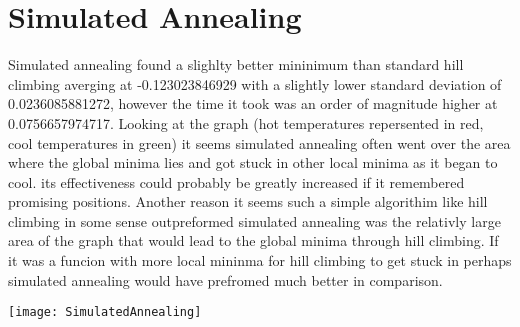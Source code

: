 \documentclass[12pt]{article}
\begin{document}
\section{Simulated Annealing}
Simulated annealing found a slighlty better mininimum than standard hill climbing averging at -0.123023846929 with a slightly lower standard deviation of 0.0236085881272, however the time it took was an order of magnitude higher at 0.0756657974717. Looking at the graph (hot temperatures repersented in red, cool temperatures in green) it seems simulated annealing often went over the area where the global minima lies and got stuck in other local minima as it began to cool. its effectiveness could probably be greatly increased if it remembered promising positions. Another reason it seems such a simple algorithim like hill climbing in some sense outpreformed simulated annealing was the relativly large area of the graph that would lead to the global minima through hill climbing. If it was a funcion with more local mininma for hill climbing to get stuck in perhaps simulated annealing would have prefromed much better in comparison.

\texttt{[image: SimulatedAnnealing]}
\end{document}
